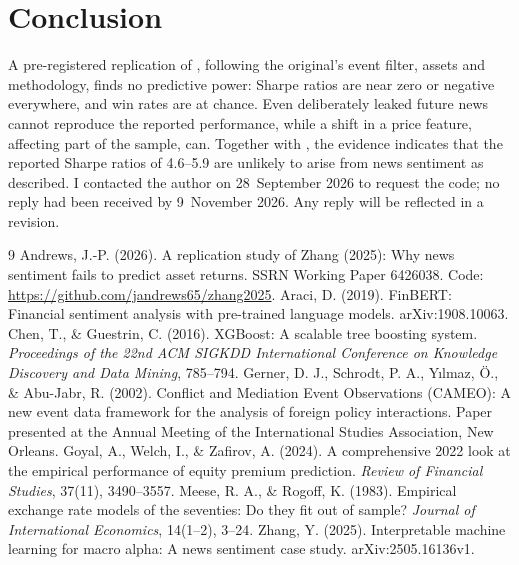\documentclass[11pt]{article}
\begin{document}
\section{Conclusion}
A pre-registered replication of \citet{zhang2025}, following the original's event filter, assets and methodology,
finds no predictive power: Sharpe ratios are near zero or negative everywhere, and win rates are at chance. Even
deliberately leaked future news cannot reproduce the reported performance, while a shift in a price feature,
affecting part of the sample, can. Together with \citet{andrews2026}, the evidence indicates that the reported Sharpe ratios of 4.6--5.9 are
unlikely to arise from news sentiment as described. I contacted the author on 28~September 2026 to request the
code; no reply had been received by 9~November 2026. Any reply will be reflected in a revision.

\begin{thebibliography}{9}
 Andrews, J.-P. (2026). A replication study of Zhang (2025): Why news sentiment
fails to predict asset returns. SSRN Working Paper 6426038. Code: \url{https://github.com/jandrews65/zhang2025}.
 Araci, D. (2019). FinBERT: Financial sentiment analysis with pre-trained language
models. arXiv:1908.10063.
 Chen, T., \& Guestrin, C. (2016). XGBoost: A scalable tree boosting
system. \emph{Proceedings of the 22nd ACM SIGKDD International Conference on Knowledge Discovery and Data Mining},
785--794.
 Gerner, D. J., Schrodt, P. A., Y{\i}lmaz, \"O., \& Abu-Jabr, R. (2002).
Conflict and Mediation Event Observations (CAMEO): A new event data framework for the analysis of foreign policy
interactions. Paper presented at the Annual Meeting of the International Studies Association, New Orleans.
 Goyal, A., Welch, I., \& Zafirov, A. (2024). A comprehensive 2022 look at
the empirical performance of equity premium prediction. \emph{Review of Financial Studies}, 37(11), 3490--3557.
 Meese, R. A., \& Rogoff, K. (1983). Empirical exchange rate models of the
seventies: Do they fit out of sample? \emph{Journal of International Economics}, 14(1--2), 3--24.
 Zhang, Y. (2025). Interpretable machine learning for macro alpha: A news sentiment
case study. arXiv:2505.16136v1.
\end{thebibliography}
\end{document}
